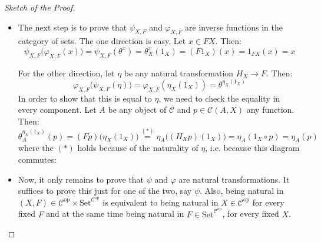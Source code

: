 \begin{proof}[Sketch of the Proof]
\begin{itemize}
The definition of $\varphi$ is not over yet, since we have to prove that $\theta^x$ is indeed natural in $A$, i.e. that for every morphism $f^{\mathrm{op}}\in\mathcal{C}(A,B)$ the following diagram commutes:
\begin{center}
\end{center}
which does, since both directions take $q$ to $(F(q\circ f))(x)$.

\item The next step is to prove that $\psi_{X,F}$ and $\varphi_{X,F}$ are inverse functions in the category of sets. The one direction is easy. Let $x\in FX$. Then:
\[\psi_{X,F}\big(\varphi_{X,F}(x)\big)=\psi_{X,F}(\theta^x)=\theta^x_X(1_X)=(F1_X)(x)=1_{FX}(x)=x\]

For the other direction, let $\eta$ be any natural transformation $H_X\to F$. Then:
\[\varphi_{X,F}\big(\psi_{X,F}(\eta)\big)=\varphi_{X,F}(\eta_X(1_X))=\theta^{\eta_X(1_X)}\]
In order to show that this is equal to $\eta$, we need to check the equality in every component. Let $A$ be any object of $\mathcal{C}$ and $p\in\mathcal{C}(A,X)$ any function. Then:
\[\theta^{\eta_X(1_X)}_A(p)=(Fp)\big(\eta_X(1_X)\big)\overset{(*)}{=}\eta_A\big((H_Xp)(1_X)\big)=\eta_A(1_X\circ p)=\eta_A(p)\]
where the $(*)$ holds because of the naturality of $\eta$, i.e. because this diagram commutes:
\begin{center}
\end{center}

\item Now, it only remains to prove that $\psi$ and $\varphi$ are natural transformations. It suffices to prove this just for one of the two, say $\psi$. Also, being natural in $(X,F)\in\mathcal{C}^{\mathrm{op}}\times\mathrm{Set}^{\mathcal{C}^{\mathrm{op}}}$ is equivalent to being natural in $X\in\mathcal{C}^{\mathrm{op}}$ for every fixed $F$ and at the same time being natural in $F\in\mathrm{Set}^{\mathcal{C}^{\mathrm{op}}}$, for every fixed $X$.


\end{itemize}
\end{proof}
